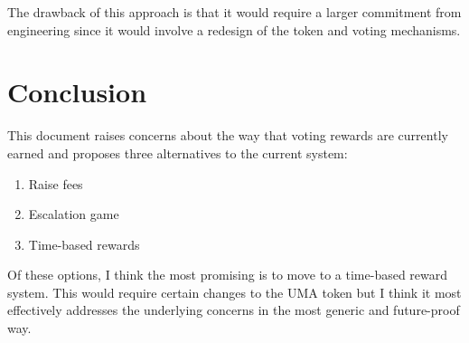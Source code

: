 \item \documentclass[12pt]{article}
\begin{document}
  The drawback of this approach is that it would require a larger commitment from engineering since it would involve a
  redesign of the token and voting mechanisms.


\section{Conclusion}

  This document raises concerns about the way that voting rewards are currently earned and proposes three alternatives
  to the current system:

  \begin{enumerate}
    \item Raise fees
    \item Escalation game
    \item Time-based rewards
  \end{enumerate}

  Of these options, I think the most promising is to move to a time-based reward system. This would require certain
  changes to the UMA token but I think it most effectively addresses the underlying concerns in the most generic and
  future-proof way.
\end{document}
